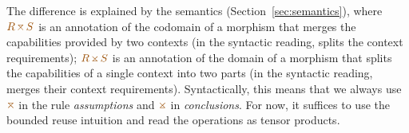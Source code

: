 The difference is explained by the semantics (Section~\ref{sec:semantics}), where
$\aclrd{R}\,\amerge\,\aclrd{S}$ is an annotation of the codomain of 
a morphism that merges the capabilities provided by two contexts (in the syntactic 
reading, splits the context requirements); $\aclrd{R}\,\asplit\,\aclrd{S}$ is an annotation of
the domain of a morphism that splits the capabilities of a single context into two parts (in the
syntactic reading, merges their context requi\-rements). Syntactically, this means that we always use
$\amerge$ in the rule \emph{assumptions} and $\asplit$ in \emph{conclusions}. For now, it suffices to use the 
bounded reuse intuition and read the operations as tensor products.



